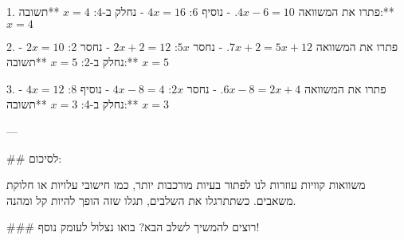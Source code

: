 1. פתרו את המשוואה $4x - 6 = 10$.
   - נוסיף 6: $4x = 16$
   - נחלק ב-4: $x = 4$
   **תשובה:** $x = 4$

2. פתרו את המשוואה $7x + 2 = 5x + 12$.
   - נחסר $5x$: $2x + 2 = 12$
   - נחסר 2: $2x = 10$
   - נחלק ב-2: $x = 5$
   **תשובה:** $x = 5$

3. פתרו את המשוואה $6x - 8 = 2x + 4$.
   - נחסר $2x$: $4x - 8 = 4$
   - נוסיף 8: $4x = 12$
   - נחלק ב-4: $x = 3$
   **תשובה:** $x = 3$

---

## לסיכום:

משוואות קוויות עוזרות לנו לפתור בעיות מורכבות יותר, כמו חישובי עלויות או חלוקת משאבים. כשתתרגלו את השלבים, תגלו שזה הופך להיות קל ומהנה.

### רוצים להמשיך לשלב הבא? בואו נצלול לעומק נוסף!

